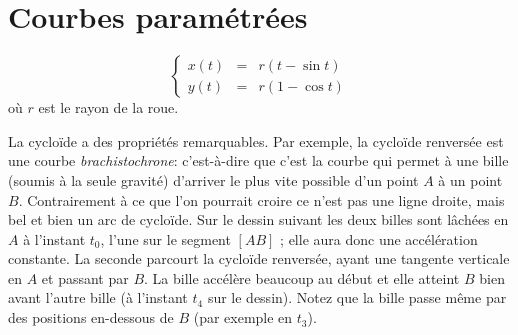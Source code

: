 \chapter{Courbes paramétrées}


$$\left\{\begin{array}{rcl}
x(t) &=& r(t-\sin t) \\
y(t) &=& r(1-\cos t)
\end{array} \right.$$
où $r$ est le rayon de la roue.

\begin{center}
\end{center}

La cycloïde a des propriétés remarquables. Par exemple, la cycloïde renversée est une courbe \emph{brachistochrone}: c'est-à-dire que c'est la courbe qui permet à une bille (soumis à la seule gravité) d'arriver le plus vite possible d'un point $A$ à un point $B$.  Contrairement à ce que l'on pourrait croire ce n'est pas une ligne droite, mais bel et bien un arc de cycloïde.  Sur le dessin suivant les deux billes sont lâchées en $A$ à l'instant $t_0$, l'une sur le segment $[AB]$ ; elle aura donc une accélération constante.  La seconde parcourt la cycloïde renversée, ayant une tangente verticale en $A$ et passant par $B$.  La bille accélère beaucoup au début et elle atteint $B$ bien avant l'autre bille (à l'instant $t_4$ sur le dessin).  Notez que la bille passe même par des positions en-dessous de $B$ (par exemple en $t_3$).  


